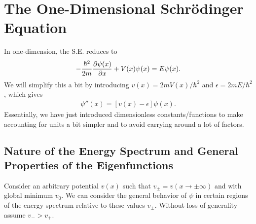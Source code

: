 \chapter{The One-Dimensional Schr\"{o}dinger Equation}

In one-dimension, the S.E. reduces to
\begin{eqnarray}
    -\frac{\hbar^2}{2m} \pdv{\psi(x)}{x} + V(x) \psi(x) = E \psi(x)
.\end{eqnarray}
We will simplify this a bit by introducing $v(x) = 2m V(x) / \hbar^2$ and $\epsilon = 2mE/\hbar^2$, which gives
\begin{eqnarray}
    \psi''(x) = [v(x) - \epsilon] \psi(x)
.\end{eqnarray}
Essentially, we have just introduced dimensionless constants/functions to make accounting for units a bit simpler and to avoid carrying around a lot of factors.

\section{Nature of the Energy Spectrum and General Properties of the Eigenfunctions}

Consider an arbitrary potential $v(x)$ such that $v_{\pm} = v(x \rightarrow \pm \infty)$ and with global minimum $v_0$.
We can consider the general behavior of $\psi$ in certain regions of the energy spectrum relative to these values $v_{\pm}$.
Without loss of generality assume $v_{-} > v_{+}$.

